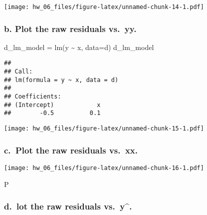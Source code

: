 \documentclass[
]{article}
\newenvironment{Shaded}{\begin{snugshade}}{\end{snugshade}}
\newcommand{\AttributeTok}[1]{\textcolor[rgb]{0.77,0.63,0.00}{#1}}
\newcommand{\FunctionTok}[1]{\textcolor[rgb]{0.00,0.00,0.00}{#1}}
\newcommand{\NormalTok}[1]{#1}
\newcommand{\OtherTok}[1]{\textcolor[rgb]{0.56,0.35,0.01}{#1}}
\newcommand{\SpecialCharTok}[1]{\textcolor[rgb]{0.00,0.00,0.00}{#1}}
\begin{document}
\texttt{[image: hw\_06\_files/figure-latex/unnamed-chunk-14-1.pdf]}

\hypertarget{b.-plot-the-raw-residuals-vs.-yy.}{%
\subsubsection{b. Plot the raw residuals
vs.~yy.}\label{b.-plot-the-raw-residuals-vs.-yy.}}

\begin{Shaded}
\begin{Highlighting}[]
\NormalTok{d\_lm\_model }\OtherTok{=} \FunctionTok{lm}\NormalTok{(y }\SpecialCharTok{\textasciitilde{}}\NormalTok{ x, }\AttributeTok{data=}\NormalTok{d)}
\NormalTok{d\_lm\_model}
\end{Highlighting}
\end{Shaded}

\begin{verbatim}
## 
## Call:
## lm(formula = y ~ x, data = d)
## 
## Coefficients:
## (Intercept)            x  
##        -0.5          0.1
\end{verbatim}

\begin{Shaded}
\end{Shaded}

\texttt{[image: hw\_06\_files/figure-latex/unnamed-chunk-15-1.pdf]}

\hypertarget{c.-plot-the-raw-residuals-vs.-xx.}{%
\subsubsection{c.~Plot the raw residuals
vs.~xx.}\label{c.-plot-the-raw-residuals-vs.-xx.}}

\begin{Shaded}
\end{Shaded}

\texttt{[image: hw\_06\_files/figure-latex/unnamed-chunk-16-1.pdf]}

P

\hypertarget{d.-lot-the-raw-residuals-vs.-y.}{%
\subsubsection{\texorpdfstring{d.~lot the raw residuals
vs.~y\^{}.}{d.~lot the raw residuals vs.~y\^{}.}}\label{d.-lot-the-raw-residuals-vs.-y.}}
\end{document}
